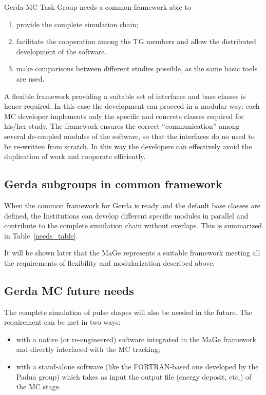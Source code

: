\documentclass[a4paper,12pt,twoside]{article}
\begin{document}
Gerda MC Task Group needs a common framework able to
\begin{enumerate}
\item provide the complete simulation chain;
\item facilitate the cooperation among the TG members and 
allow the distributed development of the software.
\item make comparisons between different studies possible,
as the same basic tools are used.
\end{enumerate} 

A flexible framework providing a suitable set of 
interfaces and base classes is hence required. In this case the 
development can proceed in a modular way: each MC 
developer implements only the specific and concrete classes required for 
his/her study. The framework ensures the correct 
``communication'' among several de-coupled modules of the software, 
so that the interfaces do no need to be re-written from scratch.
In this way the developers can effectively avoid the duplication of work
and cooperate efficiently.

\subsection{Gerda subgroups in common framework}

When the common framework for Gerda is ready and the 
default base classes are defined, the 
Institutions can develop different specific modules 
in parallel 
and contribute to the complete simulation chain without 
overlaps. This is summarized in Table~\ref{needs_table}.

It will be shown later that the MaGe 
represents a suitable framework meeting all the 
requirements of flexibility and modularization 
described above. 

\subsection{Gerda MC future needs}
The complete simulation of pulse shapes will also be needed in the
future. The requirement can be met in two ways:
\begin{itemize}
\item with a native (or re-engineered) software integrated in the MaGe
framework and directly interfaced with the MC tracking;
\item with a stand-alone software (like the FORTRAN-based one
developed by the Padua group) which takes as input the output
file (energy deposit, etc.) of the MC stage.
\end{itemize}
\end{document}
